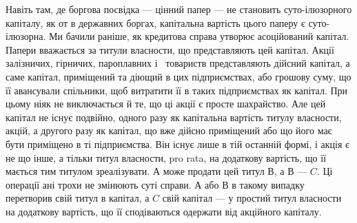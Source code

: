 Навіть там, де боргова посвідка — цінний папер — не становить суто-ілюзорного
капіталу, як от в державних боргах, капітальна вартість цього
паперу є суто-ілюзорна. Ми бачили раніше, як кредитова справа утворює асоційований
капітал. Папери вважається за титули власности, що представляють
цей капітал. Акції залізничих, гірничих, пароплавних і~ товариств представляють
дійсний капітал, а саме капітал, приміщений та діющий в цих
підприємствах, або грошову суму, що її авансували спільники, щоб витратити
її в таких підприємствах як капітал. При цьому ніяк не виключається й те,
що ці акції є просте шахрайство. Але цей капітал не існує подвійно, одного
разу як капітальна вартість титулу власности, акцій, а другого разу як капітал,
що вже дійсно приміщений або що його має бути приміщено в ті підприємства.
Він існує лише в тій останній формі, і акція є не що інше, а
тільки титул власности, pro rata, на додаткову вартість, що її мається тим
титулом зреалізувати. $А$ може продати цей титул $В$, а $В$ — $C$. Ці операції ані
трохи не змінюють суті справи. $А$ або $В$ в такому випадку перетворив свій
титул в капітал, а $C$ свій капітал — у простий титул власности на додаткову
вартість, що її сподіваються одержати від акційного капіталу.
